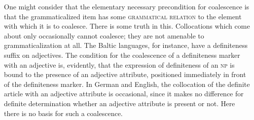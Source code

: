 One might consider that the elementary necessary precondition for coalescence is that the grammaticalized item has some \textsc{grammatical relation} to the element with which it is to coalesce. There is some truth in this. Collocations which come about only occasionally cannot coalesce; they are not amenable to grammaticalization at all. The Baltic languages, for instance, have a definiteness suffix on adjectives. The condition for the coalescence of a definiteness marker with an adjective is, evidently, that the expression of definiteness of an \textsc{np} is bound to the presence of an adjective attribute, positioned immediately in front of the definiteness marker. In German and English, the collocation of the definite article with an adjective attribute is occasional, since it makes no difference for definite determination whether an adjective attribute is present or not. Here there is no basis for such a coalescence.

